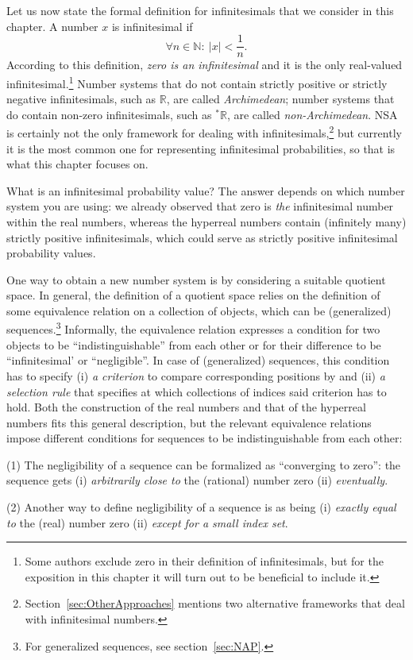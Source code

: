 Let us now state the formal definition for infinitesimals that we consider in this chapter. A number $x$ is infinitesimal if
\begin{equation}
\forall n \in \mathbb{N} : \ |x| < \frac{1}{n}.\label{eq:inf}
\end{equation}
According to this definition, \emph{zero is an infinitesimal} and it is the only real-valued infinitesimal.\footnote{Some authors exclude zero in their definition of infinitesimals, but for the exposition in this chapter it will turn out to be beneficial to include it.}
Number systems that do not contain strictly positive or strictly negative infinitesimals, such as $\mathbb{R}$, are called \emph{Archimedean}; number systems that do contain non-zero infinitesimals, such as ${^*} \mathbb{R}$, are called \emph{non-Archimedean}. NSA is certainly not the only framework for dealing with infinitesimals,\footnote{Section~\ref{sec:OtherApproaches} mentions two alternative frameworks that deal with infinitesimal numbers.} but currently it is the most common one for representing infinitesimal probabilities, so that is what this chapter focuses on.

What is an infinitesimal probability value? The answer depends on which number system you are using: we already observed that zero is \emph{the} infinitesimal number within the real numbers, whereas the hyperreal numbers contain (infinitely many) strictly positive infinitesimals, which could serve as strictly positive infinitesimal probability values.

One way to obtain a new number system is by considering a suitable quotient space. In general, the definition of a quotient space relies on the definition of some equivalence relation on a collection of objects, which can be  (generalized) sequences.\footnote{For generalized sequences, see section~\ref{sec:NAP}.} Informally, the equivalence relation expresses a condition for two objects to be ``indistinguishable'' from each other or for their difference to be ``infinitesimal' or ``negligible''. In case of (generalized) sequences, this condition has to specify (i) \textit{a criterion} to compare corresponding positions by and (ii) \textit{a selection rule} that specifies at which collections of indices said criterion has to hold. Both the construction of the real numbers and that of the hyperreal numbers fits this general description, but the relevant equivalence relations impose different conditions for sequences to be indistinguishable from each other:

\begin{description}
  \item{(1)} The negligibility of a sequence can be formalized as ``converging to zero'': the sequence gets (i) \textit{arbitrarily close to} the (rational) number zero (ii) \textit{eventually}.
  \item{(2)} Another way to define negligibility of a sequence is as being (i) \textit{exactly equal to} the (real) number zero (ii) \textit{except for a small index set}.
\end{description}

